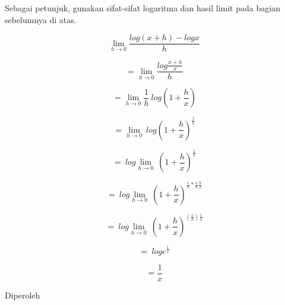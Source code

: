 \documentclass{article}
\begin{document}
\begin{eulernotebook}
\begin{eulercomment}
\begin{eulercomment}
\begin{eulercomment}
Sebagai petunjuk, gunakan sifat-sifat logaritma dan hasil limit pada
bagian sebelumnya di atas.

\end{eulercomment}
\begin{eulercomment}
\end{eulercomment}
\begin{eulerformula}
\[
\lim_{h\to 0} \frac{log(x+h)-logx}{h}
\]
\end{eulerformula}
\begin{eulercomment}
\end{eulercomment}
\begin{eulerformula}
\[
= \lim_{h\to 0} \frac{log \frac{x+h}{x}}{h}
\]
\end{eulerformula}
\begin{eulercomment}
\end{eulercomment}
\begin{eulerformula}
\[
= \lim_{h\to 0} \frac{1}{h} \ log(1+\frac{h}{x})
\]
\end{eulerformula}
\begin{eulercomment}
\end{eulercomment}
\begin{eulerformula}
\[
= \lim_{h\to 0} \ log(1+\frac{h}{x})^{\frac{1}{h}}
\]
\end{eulerformula}
\begin{eulercomment}
\end{eulercomment}
\begin{eulerformula}
\[
= \ log \lim_{h\to 0} \ (1+\frac{h}{x})^{\frac{1}{h}}
\]
\end{eulerformula}
\begin{eulercomment}
\end{eulercomment}
\begin{eulerformula}
\[
= \ log \lim_{h\to 0} \ (1+\frac{h}{x})^{\frac{1}{h}*\frac{x}{h}\frac{h}{x}}
\]
\end{eulerformula}
\begin{eulercomment}
\end{eulercomment}
\begin{eulerformula}
\[
= \ log \lim_{h\to 0} \ (1+\frac{h}{x})^{(\frac{x}{h})\frac{1}{x}}
\]
\end{eulerformula}
\begin{eulercomment}
\end{eulercomment}
\begin{eulerformula}
\[
= \ loge^{\frac{1}{x}}
\]
\end{eulerformula}
\begin{eulercomment}
\end{eulercomment}
\begin{eulerformula}
\[
= \frac{1}{x}
\]
\end{eulerformula}
\begin{eulercomment}
Diperoleh


\end{eulercomment}
\end{eulercomment}
\end{eulercomment}
\end{eulernotebook}
\end{document}
